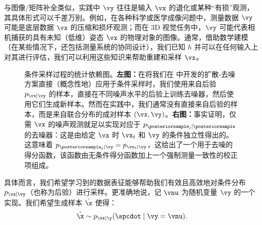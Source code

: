 \documentclass[../../book-main_zh.tex]{subfiles}
\begin{document}
与图像/矩阵补全类似，实践中 $\vy$ 往往是输入 $\vx$ 的退化或某种“有损”观测，其具体形式可以千差万别。例如，在各种科学或医学成像问题中，测量数据 $\vy$ 可能是底层数据 $\vx$ 的压缩和损坏观测；而在 3D 视觉任务中，$\vy$ 可能代表相机捕获的具有未知（低维）姿态 $\vx$ 的物理对象的图像。通常，借助数学建模（在某些情况下，还包括测量系统的协同设计），我们已知 $h$ 并可以在任何输入上对其进行评估，我们可以利用这些知识来帮助重建和采样 $\vx$。

\begin{figure}[t]
    \centering
    \begin{subfigure}{0.45\textwidth}
        \vspace{0.75cm}
        \centering
        \vspace{0.75cm}
        \caption{}
        \label{fig:left}
    \end{subfigure}
    \hfill
    \begin{subfigure}{0.45\textwidth}
        \centering
        \caption{}
        \label{fig:right}
    \end{subfigure}
    \caption{条件采样过程的统计依赖图。\textbf{左图：}在将我们在  中开发的扩散-去噪方案直接（概念性地）应用于条件采样时，我们使用来自后验 $p_{\vx \mid \vy}$ 的样本，直接在不同噪声水平的后验上训练去噪器，然后使用它们生成新样本。然而在实践中，我们通常没有直接来自后验的样本，而是来自联合分布的成对样本 $(\vx, \vy)$。\textbf{右图：}事实证明，仅需 $\vx$ 的噪声观测就足以实现对应于 $p_{\posteriorsample_t \mid \posteriorsample}$ 的去噪器：这是由给定 $\vx$ 时 $\vx_t$ 和 $\vy$ 的条件独立性得出的。这意味着 $p_{\posteriorsample_t \mid \vy} = p_{\vx_t \mid \vy}$，这给出了一个用于去噪的得分函数，该函数由无条件得分函数加上一个强制测量一致性的校正项组成。}
    \label{fig:posterior-sampling-cds}
\end{figure}

具体而言，我们希望学习到的数据表征能够帮助我们有效且高效地对条件分布 $p_{\vx\mid \vy}$（也称为后验）进行采样。更准确地说，记 $\vnu$ 为随机变量 $\vy$ 的一个实现。我们希望生成样本 $\hat{\x}$ 使得：
\begin{equation}\label{eq:goal-sample-posterior}
    \hat{\x} \sim   p_{\vx \mid \y}(\spcdot \mid \vy=\vnu).
\end{equation}
\end{document}

